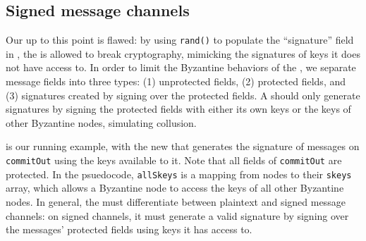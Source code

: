 \subsection{Signed message channels}
\label{sec:signed-channels-formalism}

Our \randomHarness{} up to this point is flawed: by using \texttt{rand()} to populate the ``signature'' field in  , the \randomSimulator{} is allowed to break cryptography, mimicking the signatures of keys it does not have access to.
In order to limit the Byzantine behaviors of the \randomSimulator{}, we separate message fields into three types:
(1) unprotected fields,
(2) protected fields, and
(3) signatures created by signing over the protected fields.
A \randomSimulator{} should only generate signatures by signing the protected fields with either its own keys or the keys of other Byzantine nodes, simulating collusion.


 is our running example, with the new \randomHarness{} that generates the signature of messages on \texttt{commitOut} using the keys available to it.
Note that all fields of \texttt{commitOut} are protected.
In the psuedocode, \texttt{allSkeys} is a mapping from nodes to their \texttt{skeys} array, which allows a Byzantine node to access the keys of all other Byzantine nodes.
In general, the \randomHarness{} must differentiate between plaintext and signed message channels: on signed channels, it must generate a valid signature by signing over the messages' protected fields using keys it has access to.

